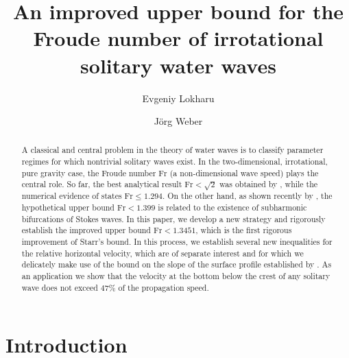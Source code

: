 \documentclass{amsart}
\title{An improved upper bound for the Froude number of irrotational solitary water waves}
\author{Evgeniy Lokharu}
\author{Jörg Weber}
\date{}
\theoremstyle{definition}
\newcommand{\Fr}{\textrm{Fr}}
\begin{document}
\begin{abstract}
A classical and central problem in the theory of water waves is to classify parameter regimes for which nontrivial solitary waves exist. In the two-dimensional, irrotational, pure gravity case, the Froude number $\Fr$ (a non-dimensional wave speed) plays the central role. So far, the best analytical result $\Fr < \sqrt{2}$ was obtained by \cite{Starr47}, while the numerical evidence of \cite{Longuet-Higgins1974-py} states $\Fr \leq 1.294$. On the other hand, as shown recently by \cite{Kozlov2023-sw}, the hypothetical upper bound $\Fr < 1.399$ is related to the existence of subharmonic bifurcations of Stokes waves. In this paper, we develop a new strategy and rigorously establish the improved upper bound $\Fr < 1.3451$, which is the first rigorous improvement of Starr's bound. In this process, we establish several new inequalities for the relative horizontal velocity, which are of separate interest and for which we delicately make use of the bound on the slope of the surface profile established by \cite{Amick1987}. As an application we show that the velocity at the bottom below the crest of any solitary wave does not exceed $47\%$ of the propagation speed.
\end{abstract}

\maketitle

\section{Introduction}
\end{document}
